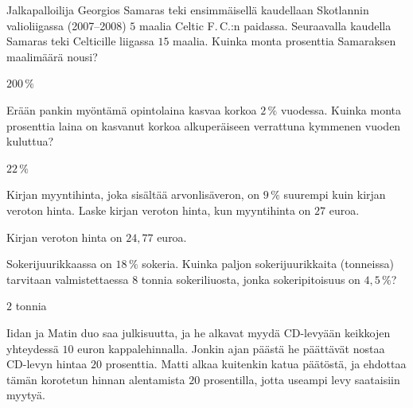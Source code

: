 \begin{tehtavasivu}
\begin{tehtava}
    Jalkapalloilija Georgios Samaras teki ensimmäisellä kaudellaan Skotlannin valioliigassa (2007--2008) $5$ maalia Celtic F.\,C.:n paidassa. Seuraavalla kaudella Samaras teki Celticille liigassa $15$ maalia. Kuinka monta prosenttia Samaraksen maalimäärä nousi?
    \begin{vastaus}
        $200\,\%$
    \end{vastaus}
\end{tehtava}

\begin{tehtava}
    Erään pankin myöntämä opintolaina kasvaa korkoa $2\,\%$ vuodessa. Kuinka monta prosenttia laina on kasvanut korkoa alkuperäiseen verrattuna kymmenen vuoden kuluttua?
    \begin{vastaus}
        $22\,\%$
    \end{vastaus}
\end{tehtava}

\begin{tehtava}
    Kirjan myyntihinta, joka sisältää arvonlisäveron, on $9\,\%$ suurempi kuin kirjan veroton hinta. Laske kirjan veroton hinta, kun myyntihinta on $27$ euroa.
    \begin{vastaus}
        Kirjan veroton hinta on $24,77$ euroa.
    \end{vastaus}
\end{tehtava}

\begin{tehtava}
    Sokerijuurikkaassa on $18\,\%$ sokeria. Kuinka paljon sokerijuurikkaita (tonneissa) tarvitaan valmistettaessa $8$ tonnia sokeriliuosta, jonka sokeripitoisuus on $4,5\,\%$?
    \begin{vastaus}
        $2$ tonnia
    \end{vastaus}
\end{tehtava}

\begin{tehtava}
    Iidan ja Matin duo saa julkisuutta, ja he alkavat myydä CD-levyään keikkojen yhteydessä $10$ euron kappalehinnalla. Jonkin ajan päästä he päättävät nostaa CD-levyn hintaa $20$ prosenttia. Matti alkaa kuitenkin katua päätöstä, ja ehdottaa tämän korotetun hinnan alentamista $20$ prosentilla, jotta useampi levy saataisiin myytyä.
    \begin{vastaus}
    \end{vastaus}
\end{tehtava}


\end{tehtavasivu}
